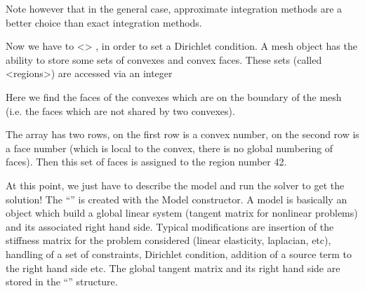 \documentclass[a4paper,11pt,english]{sphinxmanual}
\begin{document}
Note however that in the general case, approximate integration methods are a
better choice than exact integration methods.

Now we have to  \textless{}\textgreater{} , in order to
set a Dirichlet condition. A mesh object has the ability to store some sets of
convexes and convex faces. These sets (called \textless{}regions\textgreater{}) are accessed via an
integer 

\begin{sphinxVerbatim}[commandchars=\\\{\},numbers=left,firstnumber=1,stepnumber=1]

  
\end{sphinxVerbatim}

Here we find the faces of the convexes which are on the boundary of the mesh (i.e.
the faces which are not shared by two convexes).

The array  has two rows, on the first row is a convex number, on the
second row is a face number (which is local to the convex, there is no global
numbering of faces). Then this set of faces is assigned to the region number 42.

At this point, we just have to describe the model and run the solver to get the
solution! The “” is created with the Model constructor. A model
is basically an object which build a global linear system (tangent matrix for
non\sphinxhyphen{}linear problems) and its associated right hand side. Typical modifications are
insertion of the stiffness matrix for the problem considered (linear elasticity,
laplacian, etc), handling of a set of constraints, Dirichlet condition, addition of
a source term to the right hand side etc. The global tangent matrix and its right
hand side are stored in the “” structure.
\end{document}
